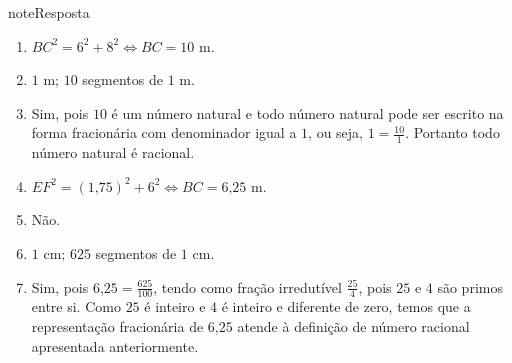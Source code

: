 \begin{sphinxadmonition}{note}{Resposta}
\begin{enumerate}
\item {} 
\(BC^2 = 6^2 + 8^2 \Leftrightarrow BC=10\) m.

\item {} 
\(1\) m; \(10\) segmentos de \(1\) m.

\item {} 
Sim, pois \(10\) é um número natural e todo número natural pode ser escrito na forma fracionária com denominador igual a \(1\), ou seja, \(1 = \frac{10}{1}\). Portanto todo número natural é racional.

\item {} 
\(EF^2 = (1\text{,}75)^2 + 6^2 \Leftrightarrow BC=6\text{,}25\) m.

\item {} 
Não.

\item {} 
\(1\) cm; \(625\) segmentos de \(1\) cm.

\item {} 
Sim, pois \(6\text{,}25 = \frac{625}{100}\),  tendo como fração irredutível  \(\frac{25}{4}\), pois \(25\) e \(4\) são primos entre si. Como \(25\) é inteiro e \(4\) é inteiro e diferente de zero, temos que a representação fracionária de \(6\text{,}25\) atende à definição de número racional apresentada anteriormente.

\end{enumerate}
\end{sphinxadmonition}
\label{\detokenize{NO103-5:sub-ativ-irracional}}
